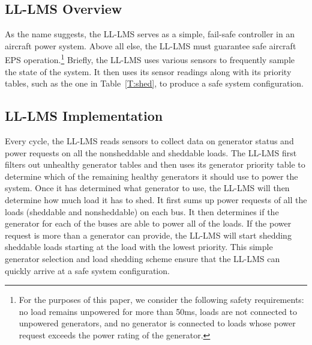 \documentclass{acm_proc_article-sp}
\begin{document}
\subsection{LL-LMS Overview}
As the name suggests, the LL-LMS serves as a simple, fail-safe controller in an aircraft power system.
Above all else, the LL-LMS must guarantee safe aircraft EPS operation.\footnote{For the purposes of this paper, we consider the following safety requirements: no load remains unpowered for more than 50ms, loads are not connected to unpowered generators, and no generator is connected to loads whose power request exceeds the power rating of the generator.}
Briefly, the LL-LMS uses various sensors to frequently sample the state of the system. It then uses its sensor readings along with its
priority tables, such as the one in Table~\ref{T:shed}, to produce a safe system configuration.

\subsection{LL-LMS Implementation}
Every cycle, the LL-LMS reads sensors to collect data on generator status and power requests on all the nonsheddable and sheddable loads. 
The LL-LMS first filters out unhealthy generator tables and then uses its generator priority table to determine which of the remaining healthy generators it should use to power the system. 
Once it has determined what generator to use, the LL-LMS will then determine how much load it has to shed. 
It first sums up power requests of all the loads (sheddable and nonsheddable) on each bus. 
It then determines if the generator for each of the buses are able to power all of the loads. 
If the power request is more than a generator can provide, the LL-LMS will start shedding sheddable loads starting at the load with the lowest priority. 
This simple generator selection and load shedding scheme ensure that the LL-LMS can quickly arrive at a safe system configuration.


\end{document}
